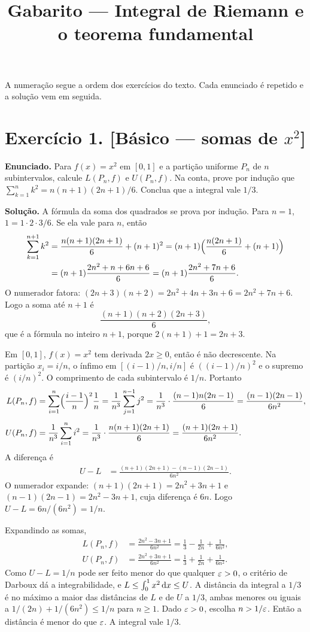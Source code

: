 \documentclass[11pt,a4paper]{article}
\title{Gabarito --- Integral de Riemann e o teorema fundamental}
\author{}
\date{}
\begin{document}
\maketitle
\tableofcontents

A numeração segue a ordem dos exercícios do texto. Cada enunciado é repetido e a solução vem em seguida.

\section*{Exercício 1. [Básico --- somas de $x^2$]}

\textbf{Enunciado.} Para $f(x)=x^2$ em $[0,1]$ e a partição uniforme $P_n$ de $n$ subintervalos, calcule $L(P_n,f)$ e $U(P_n,f)$. Na conta, prove por indução que $\sum_{k=1}^n k^2=n(n+1)(2n+1)/6$. Conclua que a integral vale $1/3$.

\textbf{Solução.}
A fórmula da soma dos quadrados se prova por indução. Para $n=1$, $1=1\cdot 2\cdot 3/6$. Se ela vale para $n$, então
\begin{align*}
\sum_{k=1}^{n+1}k^2
&=\frac{n(n+1)(2n+1)}{6}+(n+1)^2
=(n+1)\Bigl(\frac{n(2n+1)}{6}+(n+1)\Bigr)\\
&=(n+1)\frac{2n^2+n+6n+6}{6}
=(n+1)\frac{2n^2+7n+6}{6}.
\end{align*}
O numerador fatora: $(2n+3)(n+2)=2n^2+4n+3n+6=2n^2+7n+6$. Logo a soma até $n+1$ é
\[
\frac{(n+1)(n+2)(2n+3)}{6},
\]
que é a fórmula no inteiro $n+1$, porque $2(n+1)+1=2n+3$.

Em $[0,1]$, $f(x)=x^2$ tem derivada $2x\ge 0$, então é não decrescente. Na partição $x_i=i/n$, o ínfimo em $[(i-1)/n,i/n]$ é $((i-1)/n)^2$ e o supremo é $(i/n)^2$. O comprimento de cada subintervalo é $1/n$. Portanto
\begin{align*}
L(P_n,f)
&=\sum_{i=1}^n\Bigl(\frac{i-1}{n}\Bigr)^2\frac{1}{n}
=\frac{1}{n^3}\sum_{j=1}^{n-1}j^2
=\frac{1}{n^3}\cdot\frac{(n-1)n(2n-1)}{6}
=\frac{(n-1)(2n-1)}{6n^2},\\[0.4em]
U(P_n,f)
&=\frac{1}{n^3}\sum_{i=1}^n i^2
=\frac{1}{n^3}\cdot\frac{n(n+1)(2n+1)}{6}
=\frac{(n+1)(2n+1)}{6n^2}.
\end{align*}
A diferença é
\begin{align*}
U-L
&=\frac{(n+1)(2n+1)-(n-1)(2n-1)}{6n^2}.
\end{align*}
O numerador expande: $(n+1)(2n+1)=2n^2+3n+1$ e $(n-1)(2n-1)=2n^2-3n+1$, cuja diferença é $6n$. Logo $U-L=6n/(6n^2)=1/n$.

Expandindo as somas,
\begin{align*}
L(P_n,f)
&=\frac{2n^2-3n+1}{6n^2}
=\frac13-\frac{1}{2n}+\frac{1}{6n^2},\\[0.3em]
U(P_n,f)
&=\frac{2n^2+3n+1}{6n^2}
=\frac13+\frac{1}{2n}+\frac{1}{6n^2}.
\end{align*}
Como $U-L=1/n$ pode ser feito menor do que qualquer $\varepsilon>0$, o critério de Darboux dá a integrabilidade, e $L\le\int_0^1 x^2\,\mathrm{d} x\le U$. A distância da integral a $1/3$ é no máximo a maior das distâncias de $L$ e de $U$ a $1/3$, ambas menores ou iguais a $1/(2n)+1/(6n^2)\le 1/n$ para $n\ge 1$. Dado $\varepsilon>0$, escolha $n>1/\varepsilon$. Então a distância é menor do que $\varepsilon$. A integral vale $1/3$.
\end{document}
